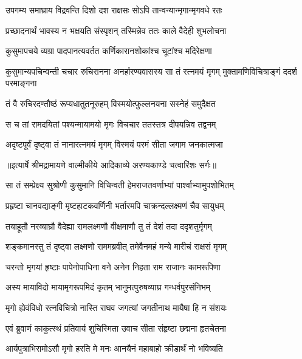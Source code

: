 \twolineshloka
{उपगम्य समाघ्राय विद्रवन्ति दिशो दश}
{राक्षसः सोऽपि तान्वन्यान्मृगान्मृगवधे रतः} %

\twolineshloka
{प्रच्छादनार्थं भावस्य न भक्षयति संस्पृशन्}
{तस्मिन्नेव ततः काले वैदेही शुभलोचना} %

\twolineshloka
{कुसुमापचये व्यग्रा पादपानत्यवर्तत}
{कर्णिकारानशोकांश्च चूटांश्च मदिरेक्षणा} %

\threelineshloka
{कुसुमान्यपचिन्वन्ती चचार रुचिरानना}
{अनर्हारण्यवासस्य सा तं रत्नमयं मृगम्}
{मुक्तामणिविचित्राङ्गं ददर्श परमाङ्गना} %

\twolineshloka
{तं वै रुचिरदण्तौष्ठं रूप्यधातुतनूरुहम्}
{विस्मयोत्फुल्लनयना सस्नेहं समुदैक्षत} %

\twolineshloka
{स च तां रामदयितां पश्यन्मायामयो मृगः}
{विचचार ततस्तत्र दीपयन्निव तद्वनम्} %

\twolineshloka
{अदृष्टपूर्वं दृष्ट्वा तं नानारत्नमयं मृगम्}
{विस्मयं परमं सीता जगाम जनकात्मजा} %


{॥इत्यार्षे श्रीमद्रामायणे वाल्मीकीये आदिकाव्ये अरण्यकाण्डे चत्वारिंशः सर्गः॥}


\twolineshloka
{सा तं सम्प्रेक्ष्य सुश्रोणी कुसुमानि विचिन्वती}
{हेमराजतवर्णाभ्यां पार्श्वाभ्यामुपशोभितम्} %

\twolineshloka
{प्रहृष्टा चानवद्याङ्गी मृष्टहाटकवर्णिनी}
{भर्तारमपि चाक्रन्दल्लक्ष्मणं चैव सायुधम्} %

\twolineshloka
{तयाहूतौ नरव्याघ्रौ वैदेह्या रामलक्ष्मणौ}
{वीक्षमाणौ तु तं देशं तदा ददृशतुर्मृगम्} %

\twolineshloka
{शङ्कमानस्तु तं दृष्ट्वा लक्ष्मणो राममब्रवीत्}
{तमेवैनमहं मन्ये मारीचं राक्षसं मृगम्} %

\twolineshloka
{चरन्तो मृगयां हृष्टाः पापेनोपाधिना वने}
{अनेन निहता राम राजानः कामरूपिणा} %

\twolineshloka
{अस्य मायाविदो मायामृगरूपमिदं कृतम्}
{भानुमत्पुरुषव्याघ्र गन्धर्वपुरसंनिभम्} %

\twolineshloka
{मृगो ह्येवंविधो रत्नविचित्रो नास्ति राघव}
{जगत्यां जगतीनाथ मायैषा हि न संशयः} %

\twolineshloka
{एवं ब्रुवाणं काकुत्स्थं प्रतिवार्य शुचिस्मिता}
{उवाच सीता संहृष्टा छद्मना हृतचेतना} %

\twolineshloka
{आर्यपुत्राभिरामोऽसौ मृगो हरति मे मनः}
{आनयैनं महाबाहो क्रीडार्थं नो भविष्यति} %

